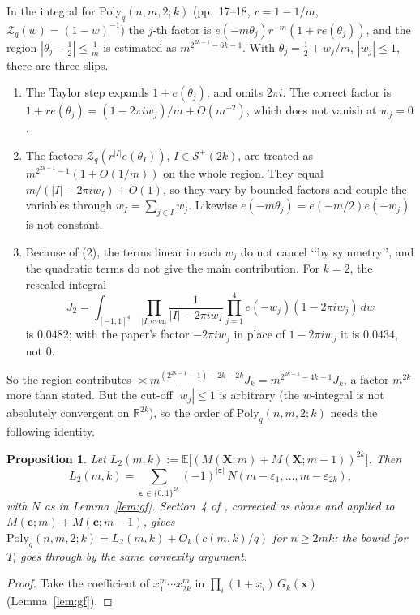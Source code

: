 \documentclass[11pt,a4paper]{amsart}
\newtheorem{proposition}[theorem]{Proposition}
\theoremstyle{remark}
\newcommand{\bc}{\mathbf c}
\newcommand{\bX}{\mathbf X}
\newcommand{\E}{\mathbb E}
\begin{document}
In the integral for $\mathrm{Poly}_q(n,m,2;k)$ (pp.~17--18, $r=1-1/m$, $\mathcal Z_q(w)=(1-w)^{-1}$) the
$j$-th factor is $e(-m\theta_j)r^{-m}(1+re(\theta_j))$, and the region $|\theta_j-\frac12|\le\frac1m$ is
estimated as $m^{2^{2k-1}-6k-1}$. With $\theta_j=\frac12+w_j/m$, $|w_j|\le1$, there are three slips.
\begin{enumerate}
\item The Taylor step expands $1+e(\theta_j)$, and omits $2\pi i$. The correct factor is
$1+re(\theta_j)=(1-2\pi iw_j)/m+O(m^{-2})$, which does not vanish at $w_j=0$.
\item The factors $\mathcal Z_q(r^{|I|}e(\theta_I))$, $I\in\mathcal S^+(2k)$, are treated as
$m^{2^{2k-1}-1}(1+O(1/m))$ on the whole region. They equal $m/(|I|-2\pi iw_I)+O(1)$, so they vary by
bounded factors and couple the variables through $w_I=\sum_{j\in I}w_j$. Likewise
$e(-m\theta_j)=e(-m/2)e(-w_j)$ is not constant.
\item Because of (2), the terms linear in each $w_j$ do not cancel \lq\lq by symmetry\rq\rq, and the
quadratic terms do not give the main contribution. For $k=2$, the rescaled integral
\[
J_2=\int_{[-1,1]^4}\prod_{|I|\,\mathrm{even}}\frac1{|I|-2\pi iw_I}\prod_{j=1}^4e(-w_j)(1-2\pi iw_j)\,dw
\]
is $0.0482$; with the paper's factor $-2\pi iw_j$ in place of $1-2\pi iw_j$ it is $0.0434$, not $0$.
\end{enumerate}
So the region contributes $\asymp m^{(2^{2k-1}-1)-2k-2k}J_k=m^{2^{2k-1}-4k-1}J_k$, a factor $m^{2k}$
more than stated. But the cut-off $|w_j|\le1$ is arbitrary (the $w$-integral is not absolutely convergent
on $\mathbb R^{2k}$), so the order of $\mathrm{Poly}_q(n,m,2;k)$ needs the following identity.

\begin{proposition}\label{prop:L2}
Let $L_2(m,k):=\E\bigl[(M(\bX;m)+M(\bX;m-1))^{2k}\bigr]$. Then
\[
L_2(m,k)=\sum_{\boldsymbol\varepsilon\in\{0,1\}^{2k}}(-1)^{|\boldsymbol\varepsilon|}\,N(m-\varepsilon_1,\dots,m-\varepsilon_{2k}),
\]
with $N$ as in Lemma~\ref{lem:gf}. Section~4 of \cite{GKM}, corrected as above and applied to
$M(\bc;m)+M(\bc;m-1)$, gives $\mathrm{Poly}_q(n,m,2;k)=L_2(m,k)+O_k(c(m,k)/q)$ for $n\ge2mk$; the bound for $T_i$ goes through by the same convexity argument.
\end{proposition}

\begin{proof}
Take the coefficient of $x_1^m\cdots x_{2k}^m$ in $\prod_i(1+x_i)\,G_k(\mathbf x)$ (Lemma~\ref{lem:gf}).
\end{proof}
\end{document}

